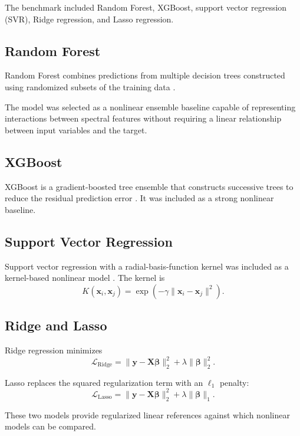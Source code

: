 \documentclass[conference]{IEEEtran}
\begin{document}
The benchmark included Random Forest, XGBoost, support vector regression (SVR), Ridge regression, and Lasso regression.

\subsection{Random Forest}
Random Forest combines predictions from multiple decision trees constructed using randomized subsets of the training data \cite{breiman2001}.

The model was selected as a nonlinear ensemble baseline capable of representing interactions between spectral features without requiring a linear relationship between input variables and the target.

\subsection{XGBoost}
XGBoost is a gradient-boosted tree ensemble that constructs successive trees to reduce the residual prediction error \cite{chen2016}. It was included as a strong nonlinear baseline.

\subsection{Support Vector Regression}
Support vector regression with a radial-basis-function kernel was included as a kernel-based nonlinear model \cite{cortes1995}. The kernel is
\begin{equation}
K(\mathbf{x}_i, \mathbf{x}_j) = \exp\left(-\gamma \|\mathbf{x}_i - \mathbf{x}_j\|^2\right).
\end{equation}

\subsection{Ridge and Lasso}
Ridge regression minimizes
\begin{equation}
\mathcal{L}_{\text{Ridge}} = \|\mathbf{y} - \mathbf{X}\boldsymbol{\beta}\|_2^2 + \lambda \|\boldsymbol{\beta}\|_2^2.
\end{equation}

Lasso replaces the squared regularization term with an $\ell_1$ penalty:
\begin{equation}
\mathcal{L}_{\text{Lasso}} = \|\mathbf{y} - \mathbf{X}\boldsymbol{\beta}\|_2^2 + \lambda \|\boldsymbol{\beta}\|_1.
\end{equation}

These two models provide regularized linear references against which nonlinear models can be compared.
\end{document}
